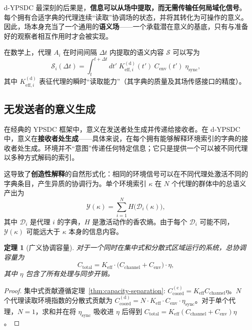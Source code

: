 \documentclass[12pt,a4paper]{article}
\newtheorem{theorem}{定理}[section]
\theoremstyle{remark}
\begin{document}
	d-YPSDC 最深刻的后果是，\textbf{信息可以从场中提取，而无需传输任何局域化信号}。每个拥有合适字典的代理连续“读取”协调场的状态，并将其转化为可操作的意义。因此，场本身充当了一个通用的\textbf{语义场}——一个承载潜在意义的基底，只有与准备好的观察者相互作用时才会被实现。
	
	在数学上，代理 $A_i$ 在时间间隔 $\Delta t$ 内提取的语义内容 $\mathcal{S}$ 可以写为
	\begin{equation}
		\mathcal{S}_i(\Delta t) = \int_{t}^{t+\Delta t} dt' \;
		K_{\mathrm{eff},i}^{\mathrm{(d)}}(t') \; C_{\mathrm{env}}(t') \; \eta_{\mathrm{sync}},
		\label{eq:semantic-content}
	\end{equation}
	其中 $K_{\mathrm{eff},i}^{\mathrm{(d)}}$ 表征代理的瞬时“读取能力”（其字典的质量及其场传感接口的精度）。
	
	\subsection{无发送者的意义生成}
	\label{subsec:meaning-generation}
	
	在经典的 YPSDC 框架中，意义在发送者处生成并传递给接收者。在 d-YPSDC 中，意义在\textbf{接收者处生成}——具体来说，在每个拥有能够解释环境索引的字典的接收者处生成。环境并不“意图”传递任何特定信息；它只是提供一个可以被不同代理以多种方式解码的索引。
	
	这导致了\textbf{创造性解释}的自然形式化：相同的环境信号可以在不同代理处激活不同的字典条目，产生异质的协调行为。单个环境索引 $\kappa$ 在 $N$ 个代理的群体中的总语义产出为
	\begin{equation}
		\mathcal{Y}(\kappa) = \sum_{i=1}^{N} H\bigl(\mathcal{D}_i(\kappa)\bigr),
		\label{eq:semantic-yield}
	\end{equation}
	其中 $\mathcal{D}_i$ 是代理 $i$ 的字典，$H$ 是激活动作的香农熵。由于每个 $\mathcal{D}_i$ 可能不同，$\mathcal{Y}(\kappa)$ 可能远大于 $\kappa$ 本身的信息内容。
	
	\begin{theorem}[广义协调容量]
		对于一个同时在集中式和分散式区域运行的系统，总协调容量为
		\begin{equation}
			\boxed{C_{\mathrm{total}} = K_{\mathrm{eff}} \cdot \bigl( C_{\mathrm{channel}} + C_{\mathrm{env}} \bigr) \cdot \eta},
			\label{eq:generalized-capacity}
		\end{equation}
		其中 \(\eta\) 包含了所有处理与同步开销。
	\end{theorem}
	
	\begin{proof}
		集中式贡献遵循定理~\ref{thm:capacity-separation}: \(C_{\mathrm{coord}}^{\mathrm{(c)}} = K_{\mathrm{eff}} C_{\mathrm{channel}} \eta\)。$N$ 个代理读取环境指数的分散式贡献为 \(C_{\mathrm{coord}}^{\mathrm{(d)}} = N \cdot K_{\mathrm{eff}} \cdot C_{\mathrm{env}} \cdot \eta_{\mathrm{sync}}\)。对于单个代理，$N=1$，求和并在将 \(\eta_{\mathrm{sync}}\) 吸收进 \(\eta\) 后得到 \(C_{\mathrm{total}} = K_{\mathrm{eff}}(C_{\mathrm{channel}} + C_{\mathrm{env}})\eta\)。
	\end{proof}
	
\end{document}
